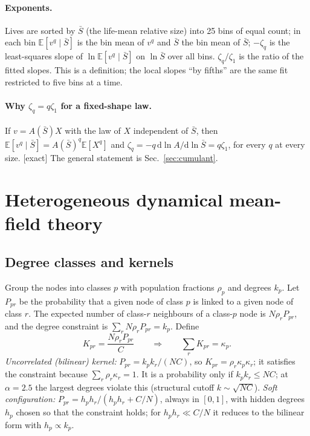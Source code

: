 \documentclass[11pt]{article}
\newcommand{\E}{\mathbb E}
\newcommand{\Sb}{\bar S}
\newcommand{\dd}{\mathrm d}
\newcommand{\exact}{\textsf{\small[exact]}}
\begin{document}
\paragraph{Exponents.}  Lives are sorted by $\Sb$ (the life-mean relative size) into 25 bins of equal count;
in each bin $\E[v^q\mid\Sb]$ is the bin mean of $v^q$ and $\Sb$ the bin mean of $\Sb$; $-\zeta_q$ is the
least-squares slope of $\ln\E[v^q\mid\Sb]$ on $\ln\Sb$ over all bins.  $\zeta_q/\zeta_1$ is the ratio of the
fitted slopes.  This is a definition; the local slopes ``by fifths'' are the same fit restricted to five
bins at a time.

\paragraph{Why $\zeta_q=q\zeta_1$ for a fixed-shape law.}  If $v=A(\Sb)X$ with the law of $X$ independent of
$\Sb$, then $\E[v^q\mid\Sb]=A(\Sb)^q\E[X^q]$ and $\zeta_q=-q\,\dd\ln A/\dd\ln\Sb=q\zeta_1$, for every $q$ at
every size.  \exact{}  The general statement is Sec.~\ref{sec:cumulant}.

\section{Heterogeneous dynamical mean-field theory}
\label{sec:hdmft}

\subsection{Degree classes and kernels}

Group the nodes into classes $p$ with population fractions $\rho_p$ and degrees $k_p$.  Let $P_{pr}$ be the
probability that a given node of class $p$ is linked to a given node of class $r$.  The expected number
of class-$r$ neighbours of a class-$p$ node is $N\rho_rP_{pr}$, and the degree constraint is
$\sum_rN\rho_rP_{pr}=k_p$.  Define
\begin{equation}
K_{pr}=\frac{N\rho_rP_{pr}}{C}\qquad\Rightarrow\qquad\sum_rK_{pr}=\kappa_p .
\end{equation}
\emph{Uncorrelated (bilinear) kernel:} $P_{pr}=k_pk_r/(NC)$, so $K_{pr}=\rho_r\kappa_p\kappa_r$; it satisfies
the constraint because $\sum_r\rho_r\kappa_r=1$.  It is a probability only if $k_pk_r\le NC$; at $\alpha=2.5$
the largest degrees violate this (structural cutoff $k\sim\sqrt{NC}$).  \emph{Soft configuration:}
$P_{pr}=h_ph_r/(h_ph_r+C/N)$, always in $[0,1]$, with hidden degrees $h_p$ chosen so that the constraint
holds; for $h_ph_r\ll C/N$ it reduces to the bilinear form with $h_p\propto k_p$.
\end{document}
